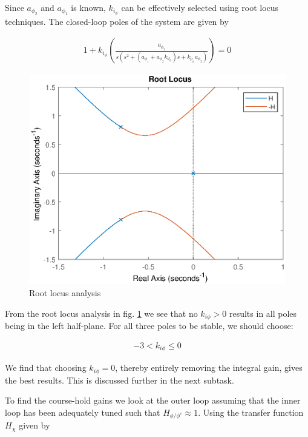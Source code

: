 Since $a_{\phi_2}$ and $a_{\phi_1}$ is known, $k_{i_\phi}$ can be effectively selected using root locus techniques. The closed-loop poles of the system are given by 

\begin{align}
    1 + k_{i_\phi} \left(\frac{a_{\phi_2}}{s(s^2 + (a_{\phi_1} + a_{\phi_2}k_{d_\phi})s + k_{p_\phi}a_{\phi_2})} \right) = 0 
\end{align}

\begin{figure}[h!]
    \centering
    \includegraphics[width=\textwidth]{rootlocus.eps}
    \caption{Root locus analysis}
    \label{fig:root_locus}
\end{figure}

From the root locus analysis in fig. \ref{fig:root_locus} we see that no $k_{i\phi} > 0$ results in all poles being in the left half-plane. For all three poles to be stable, we should choose:

\begin{align}
    -3 < k_{i\phi} \leq 0
\end{align}


We find that choosing $ k_{i\phi} = 0$, thereby entirely removing the integral gain, gives the best results. This is discussed further in the next subtask. 



To find the course-hold gains we look at the outer loop assuming that the inner loop has been adequately tuned such that $H_{\phi/\phi^c} \approx 1$. Using the transfer function $H_{\chi}$ given by

